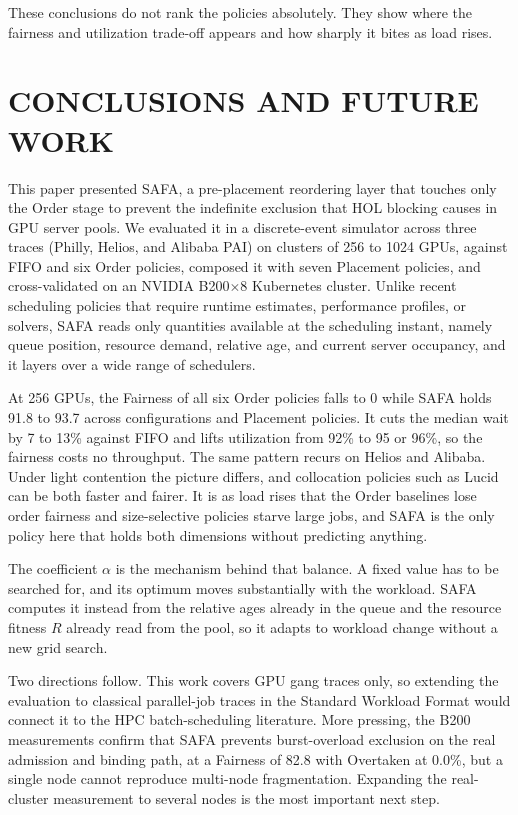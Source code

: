 \documentclass{ieeetj}
\begin{document}
These conclusions do not rank the policies absolutely. They show where the fairness and utilization trade-off appears and how sharply it bites as load rises.

\FloatBarrier

\section{CONCLUSIONS AND FUTURE WORK}\label{conclu}

This paper presented SAFA, a pre-placement reordering layer that touches only the Order stage to prevent the indefinite exclusion that HOL blocking causes in GPU server pools. We evaluated it in a discrete-event simulator across three traces (Philly, Helios, and Alibaba PAI) on clusters of 256 to 1024 GPUs, against FIFO and six Order policies, composed it with seven Placement policies, and cross-validated on an NVIDIA B200$\times$8 Kubernetes cluster. Unlike recent scheduling policies that require runtime estimates, performance profiles, or solvers, SAFA reads only quantities available at the scheduling instant, namely queue position, resource demand, relative age, and current server occupancy, and it layers over a wide range of schedulers.

At 256 GPUs, the Fairness of all six Order policies falls to 0 while SAFA holds 91.8 to 93.7 across configurations and Placement policies. It cuts the median wait by 7 to 13\% against FIFO and lifts utilization from 92\% to 95 or 96\%, so the fairness costs no throughput. The same pattern recurs on Helios and Alibaba. Under light contention the picture differs, and collocation policies such as Lucid can be both faster and fairer. It is as load rises that the Order baselines lose order fairness and size-selective policies starve large jobs, and SAFA is the only policy here that holds both dimensions without predicting anything.

The coefficient $\alpha$ is the mechanism behind that balance. A fixed value has to be searched for, and its optimum moves substantially with the workload. SAFA computes it instead from the relative ages already in the queue and the resource fitness $R$ already read from the pool, so it adapts to workload change without a new grid search.

Two directions follow. This work covers GPU gang traces only, so extending the evaluation to classical parallel-job traces in the Standard Workload Format would connect it to the HPC batch-scheduling literature. More pressing, the B200 measurements confirm that SAFA prevents burst-overload exclusion on the real admission and binding path, at a Fairness of 82.8 with Overtaken at 0.0\%, but a single node cannot reproduce multi-node fragmentation. Expanding the real-cluster measurement to several nodes is the most important next step.
\end{document}
